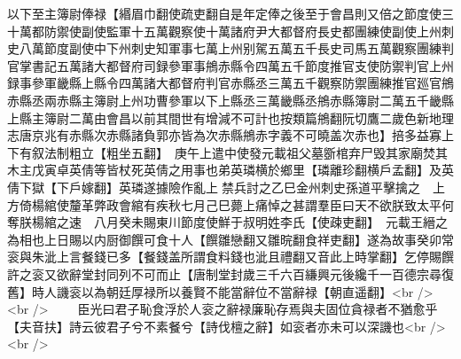 以下至主簿尉俸禄【緡眉巾翻使疏吏翻自是年定俸之後至于會昌則又倍之節度使三十萬都防禦使副使監軍十五萬觀察使十萬諸府尹大都督府長史都團練使副使上州刺史八萬節度副使中下州刺史知軍事七萬上州别駕五萬五千長史司馬五萬觀察團練判官掌書記五萬諸大都督府司録參軍事鴘赤縣令四萬五千節度推官支使防禦判官上州録事參軍畿縣上縣令四萬諸大都督府判官赤縣丞三萬五千觀察防禦團練推官廵官鴘赤縣丞兩赤縣主簿尉上州功曹參軍以下上縣丞三萬畿縣丞鴘赤縣簿尉二萬五千畿縣上縣主簿尉二萬由會昌以前其間世有增減不可計也按類篇鴘翻阮切鷹二歲色新地理志唐京兆有赤縣次赤縣諸負郭亦皆為次赤縣鴘赤字義不可曉盖次赤也】掊多益寡上下有叙法制粗立【粗坐五翻】　庚午上遣中使發元載祖父墓斵棺弃尸毁其家廟焚其木主戊寅卓英倩等皆杖死英倩之用事也弟英璘横於鄉里【璘離珍翻横戶孟翻】及英倩下獄【下戶嫁翻】英璘遂據險作亂上禁兵討之乙巳金州刺史孫道平擊擒之　上方倚楊綰使釐革弊政會綰有疾秋七月己巳薨上痛悼之甚謂羣臣曰天不欲朕致太平何奪朕楊綰之速　八月癸未賜東川節度使鮮于叔明姓李氏【使疎吏翻】　元載王縉之為相也上日賜以内厨御饌可食十人【饌雛戀翻又雛晥翻食祥吏翻】遂為故事癸卯常衮與朱泚上言餐錢已多【餐錢盖所謂食料錢也泚且禮翻又音此上時掌翻】乞停賜饌許之衮又欲辭堂封同列不可而止【唐制堂封歲三千六百縑興元後纔千一百德宗尋復舊】時人譏衮以為朝廷厚禄所以養賢不能當辭位不當辭禄【朝直遥翻】<br />
<br />
　　臣光曰君子恥食浮於人衮之辭禄廉恥存焉與夫固位貪禄者不猶愈乎【夫音扶】詩云彼君子兮不素餐兮【詩伐檀之辭】如衮者亦未可以深譏也<br />
<br />
